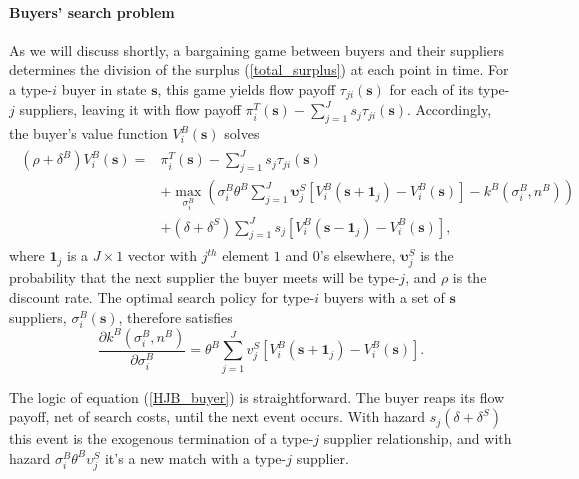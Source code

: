 \documentclass[12pt]{article} \usepackage{amsmath,amssymb,amsthm,geometry,graphicx,setspace,algorithm,algpseudocode,float}
\begin{document}
\paragraph{Buyers' search problem}

As we will discuss shortly, a bargaining game between buyers and their suppliers determines the division of the surplus (\ref{total_surplus}) at each point in time. 
For a type-$i$ buyer in state $\mathbf{s}$, this game yields flow payoff $\tau_{ji}(\mathbf{s})$  for each of its type-$j$ suppliers, leaving it with flow payoff $\pi_{i}^{T}(\mathbf{s}) - \sum_{j=1}^J s_j\tau_{ji}(\mathbf{s})$. Accordingly, the buyer's value function $V_{i}^{B}(\mathbf{s})$ solves %
\begin{align}
\begin{split}
(\rho + \delta^B) V_{i}^{B}(\mathbf{s}) =&\pi_{i}^{T}(\mathbf{s}) - \sum_{j=1}^J s_j\tau_{ji}(\mathbf{s}) \\
&+\max_{\sigma_i^B}\left(\sigma _{i}^{B}\theta ^{B}\sum_{j=1}^{J}%
\mathbf{\upsilon}_{j}^{S}\left[V_{i}^{B}(\mathbf{s}+\mathbf{1}_{j})-V_{i}^{B}(%
\mathbf{s})\right] - k^{B}(\sigma
_{i}^{B},n^B) \right)\\
&+(\delta+\delta^S)\sum_{j=1}^{J}s_{j}\left[ V_{i}^{B}(\mathbf{s}-\mathbf{1}_{j})-V_{i}^{B}(\mathbf{s})\right],
\label{HJB_buyer}
\end{split}
\end{align}%
where $\mathbf{1}_{j}$ is a $J \times 1$ vector with $j^{th}$ element $1$ and $0$'s elsewhere, $\mathbf{\upsilon}_{j}^{S}$ is the probability that the next supplier the buyer meets will be type-$j$, and $\rho$ is the discount rate. The optimal search policy for type-$i$
buyers with a set of $\mathbf{s}$ suppliers, $\sigma _{i}^{B}(\mathbf{s})$, therefore satisfies%
\begin{equation*}
\frac{\partial k^{B}\left( \sigma_{i}^{B},n^B \right) }{\partial
\sigma_{i}^{B}}=\theta ^{B}\sum_{j=1}^{J}v^S_j\left[ V_{i}^{B}(\mathbf{s}%
+\mathbf{1}_{j})-V_{i}^{B}(\mathbf{s})\right] .  \label{foc_buy}
\end{equation*}
\par
The logic of  equation (\ref{HJB_buyer}) is straightforward. The buyer reaps its flow payoff, net of search costs, until the next event occurs. With hazard $s_{j}(\delta+\delta^S)$ this event is the exogenous termination of a type-$j$ supplier relationship, and with hazard $\sigma_{i}^{B}\theta ^{B}\upsilon_{j}^{S}$ it's a new match with a type-$j$ supplier. 
\end{document}
